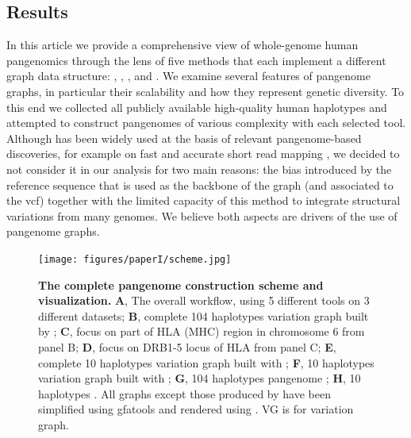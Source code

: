 \subsection{Results}
In this article we provide a comprehensive view of whole-genome human pangenomics through the lens of five methods that each implement a different graph data structure: \mbox{\bifrost}, \mbox{\mdbg}, \mbox{\minigraph}, \mbox{\mcactus} and \mbox{\pggb}. We examine several features of pangenome graphs, in particular their scalability and how they represent genetic diversity. To this end we collected all publicly available high-quality human haplotypes and attempted to construct pangenomes of various complexity with each selected tool.
Although \mbox{\vg} has been widely used at the basis of relevant pangenome-based discoveries, for example on fast and accurate short read mapping \mbox{\cite{giraffe}}, we decided to not consider it in our analysis for two main reasons: the bias introduced by the reference sequence that is used as the backbone of the graph (and associated to the vcf) together with the limited capacity of this method to integrate structural variations from many genomes. We believe both aspects are drivers of the use of pangenome graphs.
\begin{figure}[htp]
	\centering
	\texttt{[image: figures/paperI/scheme.jpg]}
	\caption[The complete human pangenome construction scheme and visualization.]{\textbf{The complete pangenome construction scheme and visualization.} \textbf{A}, The overall workflow, using 5 different tools on 3 different datasets; \textbf{B}, complete 104 haplotypes variation graph built by \minigraph; \textbf{C}, focus on part of HLA (MHC) region in chromosome 6 from panel B; \textbf{D}, focus on DRB1-5 locus of HLA from panel C; \textbf{E}, complete 10 haplotypes variation graph built with \pggb; \textbf{F}, 10 haplotypes variation graph built with \mcactus; \textbf{G}, 104 haplotypes pangenome \mdbg; \textbf{H}, 10 haplotypes \bifrost \dbg. All graphs except those produced by \minigraph have been simplified using gfatools and rendered using \bandage. VG is for variation graph.}
	\label{fig:figure1}
\end{figure}


